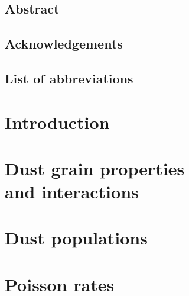 \documentclass[11pt,twoside,openright]{book}
\begin{document}
\frontmatter


\newpage\null\thispagestyle{empty}\newpage

\setcounter{page}{1}\thispagestyle{empty}\newpage

\section*{Abstract}

\newpage\null\newpage

\section*{Acknowledgements}

\newpage\null\newpage

\tableofcontents

\newpage\null\newpage
\section*{List of abbreviations}

\newpage\null\newpage



\mainmatter

\chapter{Introduction}


\chapter[Dust grain properties and interactions]{Dust grain properties\\and interactions}\label{ch:forces}


\chapter{Dust populations}\label{ch:populations}


\chapter{Poisson rates}\label{ch:statistics}

\end{document}

